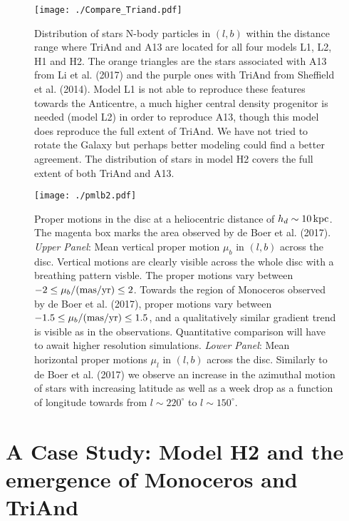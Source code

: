 \documentclass[useAMS,usenatbib]{mnras}
\begin{document}
\begin{figure}
\texttt{[image: ./Compare\_Triand.pdf]}
\caption[]{Distribution of stars N-body particles in $(l,b)$ within the distance range where TriAnd and A13 are located for all four models L1, L2, H1 and H2. The orange triangles are the stars associated with A13 from Li et al. (2017) and the purple ones with TriAnd from Sheffield et al. (2014). Model L1 is not able to reproduce these features towards the Anticentre, a much higher central density progenitor is needed (model L2) in order to reproduce A13, though this model does reproduce the full extent of TriAnd. We have not tried to rotate the Galaxy but perhaps better modeling could find a better agreement.  The distribution of stars in model H2 covers the full extent of both TriAnd and A13.}
\end{figure}


\begin{figure}
\texttt{[image: ./pmlb2.pdf]}
\caption[]{Proper motions in the disc at a heliocentric distance of $h_{d}\sim10\,\rm{kpc}$. The magenta box marks the area observed by de Boer et al. (2017). {\it Upper Panel}: Mean vertical proper motion $\mu_{b}$ in $(l,b)$ across the disc. Vertical motions are clearly visible across the whole disc with a breathing pattern visble. The proper motions vary between $-2 \leq \mu_{b}/(\rm{mas/yr}) \leq 2$. Towards the region of Monoceros observed by de Boer et al. (2017), proper motions vary between $-1.5 \leq \mu_{b}/(\rm{mas/yr}) \leq 1.5$, and a qualitatively similar gradient trend is visible as in the observations. Quantitative comparison will have to await higher resolution simulations. {\it Lower Panel}: Mean horizontal proper motions $\mu_{l}$ in $(l,b)$ across the disc. Similarly to de Boer et al. (2017) we observe an increase in the azimuthal motion of stars with increasing latitude as well as a week drop as a function of longitude towards from $l\sim220^{\circ}$ to $l\sim150^{\circ}$.}
\end{figure}



\section{A Case Study: Model H2 and the emergence of Monoceros and TriAnd}
\end{document}
